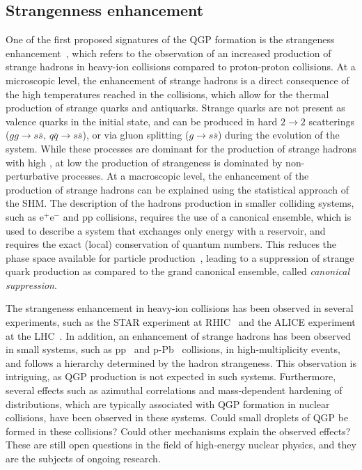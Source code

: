 \subsection{Strangenness enhancement}
One of the first proposed signatures of the QGP formation is the strangeness enhancement~\cite{Rafelski:1982pu}, which refers to the observation of an increased production of strange hadrons in heavy-ion collisions compared to proton-proton collisions. At a microscopic level, the enhancement of strange hadrons is a direct consequence of the high temperatures reached in the collisions, which allow for the thermal production of strange quarks and antiquarks. Strange quarks are not present as valence quarks in the initial state, and can be produced in hard $2\rightarrow 2$ scatterings ($gg\rightarrow s\overline{s},~q\overline{q}\rightarrow s\overline{s}$), or via gluon splitting ($g\rightarrow s\overline{s}$) during the evolution of the system. While these processes are dominant for the production of strange hadrons with high \pt, at low \pt the production of strangeness is dominated by non-perturbative processes. At a macroscopic level, the enhancement of the production of strange hadrons can be explained using the statistical approach of the SHM. The description of the hadrons production in smaller colliding systems, such as $\mathrm{e^+e^-}$ and pp collisions, requires the use of a canonical ensemble, which is used to describe a system that exchanges only energy with a reservoir, and requires the exact (local) conservation of quantum numbers. This reduces the phase space available for particle production~\cite{Redlich:2001kb}, leading to a suppression of strange quark production as compared to the grand canonical ensemble, called \emph{canonical suppression}. 

The strangeness enhancement in heavy-ion collisions has been observed in several experiments, such as the STAR experiment at RHIC~\cite{STAR:2007cqw} and the ALICE experiment at the LHC~\cite{ALICE:2013xmt}. In addition, an enhancement of strange hadrons has been observed in small systems, such as pp~\cite{ALICE:2016fzo} and p-Pb~\cite{ALICE:2013wgn, ALICE:2015mpp} collisions, in high-multiplicity events, and follows a hierarchy determined by the hadron strangeness. This observation is intriguing, as QGP production is not expected in such systems. Furthermore, several effects such as azimuthal correlations and mass-dependent hardening of \pt distributions, which are typically associated with QGP formation in nuclear collisions, have been observed in these systems. Could small droplets of QGP be formed in these collisions? Could other mechanisms explain the observed effects? These are still open questions in the field of high-energy nuclear physics, and they are the subjects of ongoing research.


